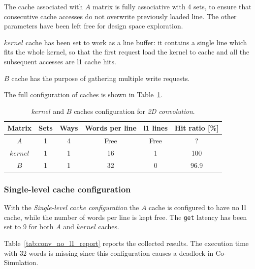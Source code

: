 \documentclass[11pt,a4paper,oneside]{memoir}
\begin{document}
The cache associated with $A$ matrix is fully associative with 4 sets, to ensure
that consecutive cache accesses do not overwrite previously loaded line.
The other parameters have been left free for design space exploration.

$kernel$ cache has been set to work as a line buffer: it contains a single line
which fits the whole kernel, so that the first request load the kernel to cache
and all the subsequent accesses are \ac{l1} cache hits.

$B$ cache has the purpose of gathering multiple write requests.

The full configuration of caches is shown in Table~\ref{tab:conv_cache_config}.

\begin{table}[H]
	\begin{center}
		\begin{tabular}{cccccc}
			\hline
			\rowcolor{gray!50}
			\textbf{Matrix} & \textbf{Sets} & \textbf{Ways} &
			\textbf{Words per line} & \textbf{\ac{l1} lines} &
			\textbf{Hit ratio} [\%] \\
			\hline
			$A$ & 1 & 4 & Free & Free & ? \\
			\rowcolor{gray!25}
			$kernel$ & 1 & 1 & 16 & 1 & 100 \\
			$B$ & 1 & 1 & 32 & 0 & 96.9 \\
			\hline
		\end{tabular}
	\end{center}
	\caption{$kernel$ and $B$ caches configuration for \emph{2D convolution}.}
	\label{tab:conv_cache_config}
\end{table}

\subsubsection{Single-level cache configuration}
With the \emph{Single-level cache configuration} the $A$ cache is configured to
have no \ac{l1} cache, while the number of words per line is kept free.
The \texttt{get} latency has been set to 9 for both $A$ and $kernel$ caches.

Table~\ref{tab:conv_no_l1_report} reports the collected results.
The execution time with 32 words is missing since this configuration causes a
deadlock in Co-Simulation.
\end{document}

